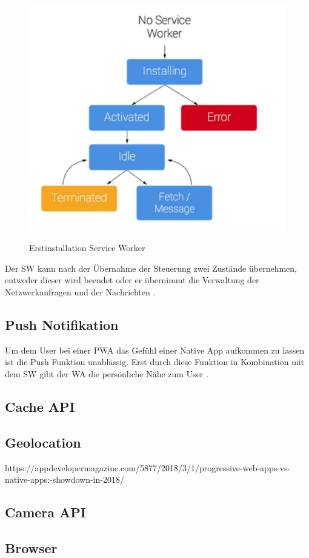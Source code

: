   \begin{figure}[h]
	\centering
	\includegraphics[width=14cm]{BilderAllgemein/InstallSW}\medskip
	\caption{Erstinstallation Service Worker}
	\label{fig:Erstinstallation}\cite{lifecycleSW}
\end{figure}

Der \acs{SW} kann nach der Übernahme der Steuerung zwei Zustände übernehmen, entweder dieser wird beendet oder er übernimmt die Verwaltung der Netzwerkanfragen und der Nachrichten \cite{lifecycleSW}.

\newpage

\subsection{Push Notifikation}
Um dem User bei einer \acs{PWA} das Gefühl einer Native App aufkommen zu lassen ist die Push Funktion unablässig. Erst durch diese Funktion in Kombination mit dem \acs{SW} gibt der \acl{WA} die persönliche Nähe zum User \cite{PushNotifikation}.
\newpage
\subsection{Cache API}

\subsection{Geolocation}
https://appdevelopermagazine.com/5877/2018/3/1/progressive-web-apps-vs-native-apps:-showdown-in-2018/


\subsection{Camera API}


\subsection{Browser} 





\newpage